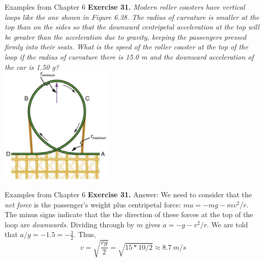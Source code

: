 \documentclass{beamer}
\begin{document}
\begin{frame}{Examples from Chapter 6}
\small
\textbf{Exercise 31.} \textit{Modern roller coasters have vertical loops like the one shown in Figure 6.38. The radius of curvature is smaller at the top than on the sides so that the downward centripetal acceleration at the top will be greater than the acceleration due to gravity, keeping the passengers pressed firmly into their seats. What is the speed of the roller coaster at the top of the loop if the radius of curvature there is 15.0 m and the downward acceleration of the car is 1.50 g?} \\
\centering
\includegraphics[width=0.4\textwidth]{figures/roll.png}
\end{frame}

\begin{frame}{Examples from Chapter 6}
\small
\textbf{Exercise 31.} \alert{Answer:} We need to consider that the \textit{net force} is the passenger's weight plus centripetal force: $ma = -mg-mv^2/r$.  The minus signs indicate that the the direction of these forces at the top of the loop are \textit{downwards.}  Dividing through by $m$ gives $a=-g-v^2/r$.  We are told that $a/g = -1.5 = -\frac{3}{2}$.  Thus,
\begin{equation}
v = \sqrt{\frac{rg}{2}} = \sqrt{15*10/2} \approx 8.7 ~ m/s
\end{equation}
\end{frame}
\end{document}
